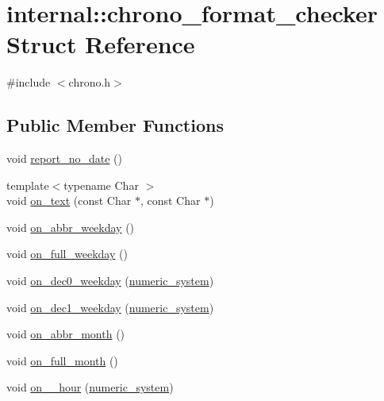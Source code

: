 \hypertarget{structinternal_1_1chrono__format__checker}{}\section{internal\+:\+:chrono\+\_\+format\+\_\+checker Struct Reference}
\label{structinternal_1_1chrono__format__checker}


{\ttfamily \#include $<$chrono.\+h$>$}

\subsection*{Public Member Functions}
\begin{DoxyCompactItemize}
\item 
void \hyperlink{structinternal_1_1chrono__format__checker_abdb2bdae8bb820a4cefec110e2d32cc4}{report\+\_\+no\+\_\+date} ()
\item 
{\footnotesize template$<$typename Char $>$ }\\void \hyperlink{structinternal_1_1chrono__format__checker_a7fc729e71d1cc7060bd47d50e44eec09}{on\+\_\+text} (const Char $\ast$, const Char $\ast$)
\item 
void \hyperlink{structinternal_1_1chrono__format__checker_a524627e86804a719897613d5819fcc2f}{on\+\_\+abbr\+\_\+weekday} ()
\item 
void \hyperlink{structinternal_1_1chrono__format__checker_aa879eb14ce0722b966177f7f0b5c01fb}{on\+\_\+full\+\_\+weekday} ()
\item 
void \hyperlink{structinternal_1_1chrono__format__checker_a1c57b6684890c479bbae69b36cdd2d31}{on\+\_\+dec0\+\_\+weekday} (\hyperlink{namespaceinternal_a16e2a1195ca0f5beab658685f71df86b}{numeric\+\_\+system})
\item 
void \hyperlink{structinternal_1_1chrono__format__checker_ab1214c0e976fb8cb8c8713f8148aad61}{on\+\_\+dec1\+\_\+weekday} (\hyperlink{namespaceinternal_a16e2a1195ca0f5beab658685f71df86b}{numeric\+\_\+system})
\item 
void \hyperlink{structinternal_1_1chrono__format__checker_a30dc98a951f59d9e678756478cff80f8}{on\+\_\+abbr\+\_\+month} ()
\item 
void \hyperlink{structinternal_1_1chrono__format__checker_a9bf4c473137e90cf7b0d8ca59a520dee}{on\+\_\+full\+\_\+month} ()
\item 
void \hyperlink{structinternal_1_1chrono__format__checker_a51eac6918a764ffa4cb67097a42876d6}{on\+\_\+\_\+hour} (\hyperlink{namespaceinternal_a16e2a1195ca0f5beab658685f71df86b}{numeric\+\_\+system})

\end{DoxyCompactItemize}
